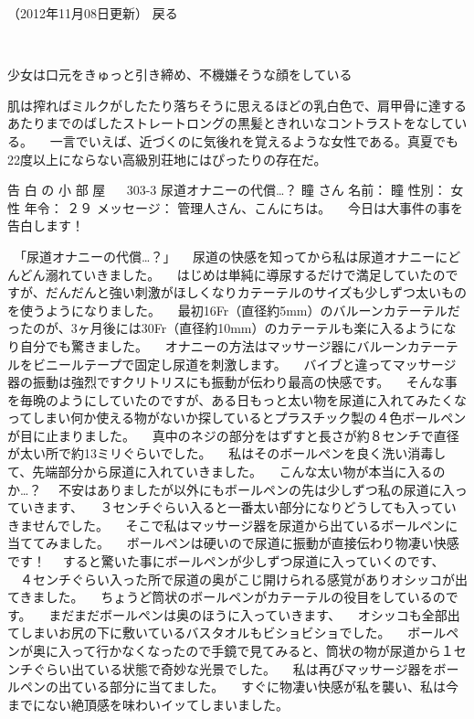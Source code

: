（2012年11月08日更新）
戻る
	 
	 	


　
			 
	

少女は口元をきゅっと引き締め、不機嫌そうな顔をしている

肌は搾ればミルクがしたたり落ちそうに思えるほどの乳白色で、肩甲骨に達するあたりまでのばしたストレートロングの黒髪ときれいなコントラストをなしている。
　一言でいえば、近づくのに気後れを覚えるような女性である。真夏でも22度以上にならない高級別荘地にはぴったりの存在だ。


告 白 の 小 部 屋
　 303-3	尿道オナニーの代償…？	瞳 さん
名前： 瞳 
性別： 女性 
年令： ２９ 
メッセージ： 管理人さん、こんにちは。 
　今日は大事件の事を告白します！ 

　「尿道オナニーの代償…？」 
　尿道の快感を知ってから私は尿道オナニーにどんどん溺れていきました。 
　はじめは単純に導尿するだけで満足していたのですが、だんだんと強い刺激がほしくなりカテーテルのサイズも少しずつ太いものを使うようになりました。 
　最初16Fr（直径約5mm）のバルーンカテーテルだったのが、3ヶ月後には30Fr（直径約10mm）のカテーテルも楽に入るようになり自分でも驚きました。 
　オナニーの方法はマッサージ器にバルーンカテーテルをビニールテープで固定し尿道を刺激します。 
　バイブと違ってマッサージ器の振動は強烈ですクリトリスにも振動が伝わり最高の快感です。 
　そんな事を毎晩のようにしていたのですが、ある日もっと太い物を尿道に入れてみたくなってしまい何か使える物がないか探しているとプラスチック製の４色ボールペンが目に止まりました。 
　真中のネジの部分をはずすと長さが約８センチで直径が太い所で約13ミリぐらいでした。 
　私はそのボールペンを良く洗い消毒して、先端部分から尿道に入れていきました。 
　こんな太い物が本当に入るのか…？ 
　不安はありましたが以外にもボールペンの先は少しずつ私の尿道に入っていきます、 
　３センチぐらい入ると一番太い部分になりどうしても入っていきませんでした。 
　そこで私はマッサージ器を尿道から出ているボールペンに当ててみました。 
　ボールペンは硬いので尿道に振動が直接伝わり物凄い快感です！ 
　すると驚いた事にボールペンが少しずつ尿道に入っていくのです、 
　４センチぐらい入った所で尿道の奥がこじ開けられる感覚がありオシッコが出てきました。 
　ちょうど筒状のボールペンがカテーテルの役目をしているのです。 
　まだまだボールペンは奥のほうに入っていきます、 
　オシッコも全部出てしまいお尻の下に敷いているバスタオルもビショビショでした。 
　ボールペンが奥に入って行かなくなったので手鏡で見てみると、筒状の物が尿道から１センチぐらい出ている状態で奇妙な光景でした。 
　私は再びマッサージ器をボールペンの出ている部分に当てました。 
　すぐに物凄い快感が私を襲い、私は今までにない絶頂感を味わいイッてしまいました。 
